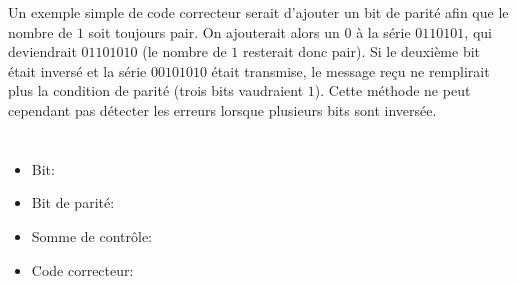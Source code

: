 {{Un exemple simple de code correcteur serait d’ajouter un bit de parité afin que le nombre de $1$ soit toujours pair. On ajouterait alors un $0$ à la série $0110101$, qui deviendrait $01101010$ (le nombre de $1$ resterait donc pair). Si le deuxième bit était inversé et la série $00101010$ était transmise, le message reçu ne remplirait plus la condition de parité (trois bits vaudraient $1$). Cette méthode ne peut cependant pas détecter les erreurs lorsque plusieurs bits sont inversée.



\section*{\BrochureWebsitesAndKeywords}
{\raggedright
\begin{itemize}
  \item Bit: \href{https://fr.wikipedia.org/wiki/Bit}{}
  \item Bit de parité: \href{https://fr.wikipedia.org/wiki/Somme_de_contr\%C3\%B4le\#Exemple_:_bit_de_parit\%C3\%A9}{}
  \item Somme de contrôle: \href{https://fr.wikipedia.org/wiki/Somme_de_contr\%C3\%B4le}{}
  \item Code correcteur: \href{https://fr.wikipedia.org/wiki/Code_correcteur}{}
\end{itemize}


}

}{}

\def\AuthorAlmomanW{} %
\def\AuthorPelletJ{} %
\def\AuthorPhillippsM{} %
\def\AuthorBaumannW{} %
\def\AuthorEscherleN{} %
\def\AuthorDatzkoS{} %
\def\AuthorPelletE{} %

\newpage}{}
